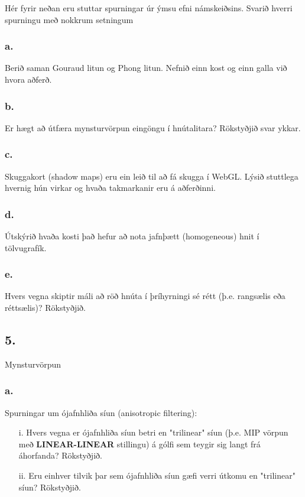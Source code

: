 \documentclass{article}
\begin{document}
Hér fyrir neðan eru stuttar spurningar úr ýmsu efni námskeiðsins. Svarið hverri
spurningu með nokkrum setningum

\subsubsection{a.}Berið saman Gouraud litun og Phong litun. Nefnið einn kost og einn galla
við hvora aðferð.

\subsubsection{b.}Er hægt að útfæra mynsturvörpun eingöngu í hnútalitara? Rökstyðjið svar
ykkar.

\subsubsection{c.}Skuggakort (shadow maps) eru ein leið til að fá skugga í WebGL. Lýsið
stuttlega hvernig hún virkar og hvaða takmarkanir eru á aðferðinni.

\subsubsection{d.}Útskýrið hvaða kosti það hefur að nota jafnþætt (homogeneous) hnit í
tölvugrafík.

\subsubsection{e.}Hvers vegna skiptir máli að röð hnúta í þríhyrningi sé rétt (þ.e. rangsælis eða
réttsælis)? Rökstyðjið.

\newpage

\subsection{5.} Mynsturvörpun

\subsubsection{a.}Spurningar um ójafnhliða síun (anisotropic filtering):

\begin{itemize}
    \item[i.]Hvers vegna er ójafnhliða síun betri en "trilinear" síun (þ.e. MIP vörpun
    með \textbf{LINEAR-LINEAR} stillingu) á gólfi sem teygir sig langt frá áhorfanda?
    Rökstyðjið.
    \item[ii.]Eru einhver tilvik þar sem ójafnhliða síun gæfi verri útkomu en "trilinear"
    síun? Rökstyðjið.
\end{itemize}
\end{document}
